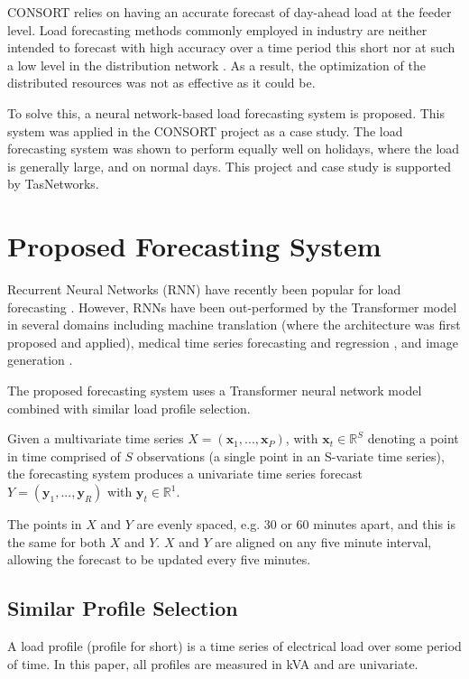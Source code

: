 \documentclass[conference]{IEEEtran}
\begin{document}
CONSORT relies on having an accurate forecast of day-ahead load at the feeder level.
Load forecasting methods commonly employed in industry are neither intended to forecast with high accuracy over a time period this short nor at such a low level in the distribution network \cite{CIGRE2016}.
As a result, the optimization of the distributed resources was not as effective as it could be.
\par
To solve this, a neural network-based load forecasting system is proposed.
This system was applied in the CONSORT project as a case study.
The load forecasting system was shown to perform equally well on holidays, where the load is generally large, and on normal days. 
This project and case study is supported by TasNetworks.


\section{Proposed Forecasting System}
Recurrent Neural Networks (RNN) have recently been popular for load forecasting \cite{Kong2018}.
However, RNNs have been out-performed by the Transformer \cite{Vaswani2017} model in several domains including machine translation \cite{Vaswani2017} (where the architecture was first proposed and applied), medical time series forecasting and regression \cite{Song2017}, and image generation \cite{Parmar2018}.
\par
The proposed forecasting system uses a Transformer neural network model combined with similar load profile selection.
\par
Given a multivariate time series $X = (\boldsymbol{x}_1, ..., \boldsymbol{x}_P)$, with $\boldsymbol{x}_t \in \mathbb{R}^S$ denoting a point in time comprised of $S$ observations (a single point in an S-variate time series), the forecasting system produces a univariate time series forecast $Y = (\boldsymbol{y}_1, ..., \boldsymbol{y}_R)$ with $\boldsymbol{y}_t \in \mathbb{R}^1$.
\par
The points in $X$ and $Y$ are evenly spaced, e.g. 30 or 60 minutes apart, and this is the same for both $X$ and $Y$.
$X$ and $Y$ are aligned on any five minute interval, allowing the forecast to be updated every five minutes.


\subsection{Similar Profile Selection}
A load profile (profile for short) is a time series of electrical load over some period of time.
In this paper, all profiles are measured in kVA and are univariate. 
\end{document}

